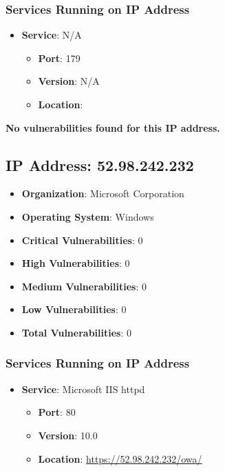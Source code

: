 \documentclass{article}
\begin{document}
\subsubsection*{Services Running on IP Address}

\begin{itemize}
    
        \item \textbf{Service}: N/A
        \begin{itemize}
            \item \textbf{Port}: 179
            \item \textbf{Version}:  N/A 
            \item \textbf{Location}: \href{  }{  }
        \end{itemize}
    
\end{itemize}


\textbf{No vulnerabilities found for this IP address.}




\clearpage



\subsection{IP Address: 52.98.242.232}

\begin{itemize}
    \item \textbf{Organization}: Microsoft Corporation
    \item \textbf{Operating System}:  Windows 
    \item \textbf{Critical Vulnerabilities}: 0
    \item \textbf{High Vulnerabilities}: 0
    \item \textbf{Medium Vulnerabilities}: 0
    \item \textbf{Low Vulnerabilities}: 0
    \item \textbf{Total Vulnerabilities}: 0
\end{itemize}

\subsubsection*{Services Running on IP Address}

\begin{itemize}
    
        \item \textbf{Service}: Microsoft IIS httpd
        \begin{itemize}
            \item \textbf{Port}: 80
            \item \textbf{Version}:  10.0 
            \item \textbf{Location}: \href{ https://52.98.242.232/owa/ }{ https://52.98.242.232/owa/ }
        \end{itemize}
    
\end{itemize}
\end{document}
